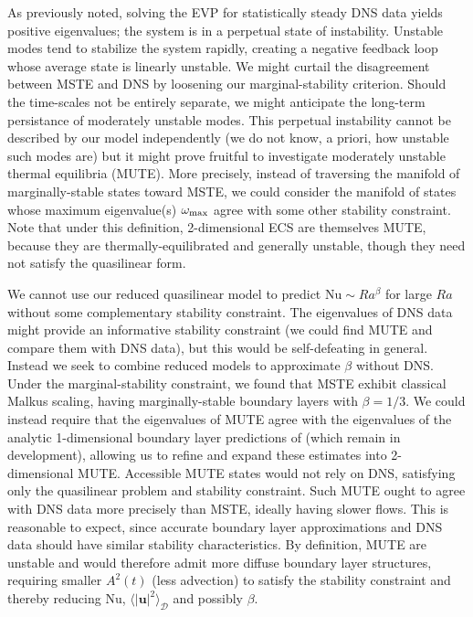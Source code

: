 \documentclass[reprint,amsmath,amssymb,aps]{revtex4-1}
\newcommand\Nu{\mathrm{Nu}}
\begin{document}
As previously noted, solving the EVP for statistically steady DNS data yields positive eigenvalues; the system is in a perpetual state of instability. 
Unstable modes tend to stabilize the system rapidly, creating a negative feedback loop whose average state is linearly unstable. 
We might curtail the disagreement between MSTE and DNS by loosening our marginal-stability criterion. 
Should the time-scales not be entirely separate, we might anticipate the long-term persistance of moderately unstable modes. 
This perpetual instability cannot be described by our model independently (we do not know, a priori, how unstable such modes are) but it might prove fruitful to investigate moderately unstable thermal equilibria (MUTE). 
More precisely, instead of traversing the manifold of marginally-stable states toward MSTE, we could consider the manifold of states whose maximum eigenvalue(s) $\omega_{\rm{max}}$ agree with some other stability constraint. 
Note that under this definition, 2-dimensional ECS are themselves MUTE, because they are thermally-equilibrated and generally unstable, though they need not satisfy the quasilinear form.

We cannot use our reduced quasilinear model to predict $\Nu \sim Ra^{\beta}$ for large $Ra$ without some complementary stability constraint. 
The eigenvalues of DNS data might provide an informative stability constraint (we could find MUTE and compare them with DNS data), but this would be self-defeating in general. 
Instead we seek to combine reduced models to approximate $\beta$ without DNS. Under the marginal-stability constraint, we found that MSTE exhibit classical Malkus scaling, having marginally-stable boundary layers with $\beta = 1/3$. 
We could instead require that the eigenvalues of MUTE agree with the eigenvalues of the analytic 1-dimensional boundary layer predictions of \cite{Shishkina, Zhang_20} (which remain in development), allowing us to refine and expand these estimates into 2-dimensional MUTE. 
Accessible MUTE states would not rely on DNS, satisfying only the quasilinear problem and stability constraint. 
Such MUTE ought to agree with DNS data more precisely than MSTE, ideally having slower flows. 
This is reasonable to expect, since accurate boundary layer approximations and DNS data should have similar stability characteristics. 
By definition, MUTE are unstable and would therefore admit more diffuse boundary layer structures, requiring smaller $A^2(t)$ (less advection) to satisfy the stability constraint and thereby reducing $\Nu$, $\langle |\mathbf{u}|^2 \rangle_{\mathcal{D}}$ and possibly $\beta$.
\end{document}
